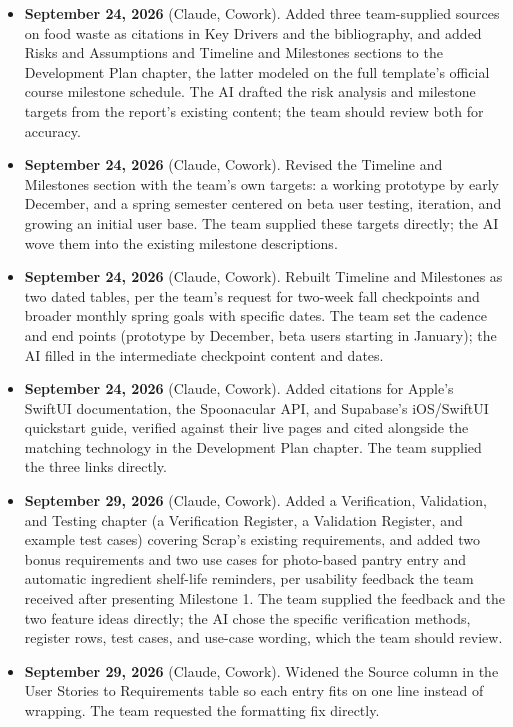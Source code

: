 \begin{itemize}[leftmargin=1.4em]
\item \textbf{September 24, 2026} (Claude, Cowork). Added three team-supplied sources on food waste as citations in Key Drivers and the bibliography, and added Risks and Assumptions and Timeline and Milestones sections to the Development Plan chapter, the latter modeled on the full template's official course milestone schedule. The AI drafted the risk analysis and milestone targets from the report's existing content; the team should review both for accuracy.

\item \textbf{September 24, 2026} (Claude, Cowork). Revised the Timeline and Milestones section with the team's own targets: a working prototype by early December, and a spring semester centered on beta user testing, iteration, and growing an initial user base. The team supplied these targets directly; the AI wove them into the existing milestone descriptions.

\item \textbf{September 24, 2026} (Claude, Cowork). Rebuilt Timeline and Milestones as two dated tables, per the team's request for two-week fall checkpoints and broader monthly spring goals with specific dates. The team set the cadence and end points (prototype by December, beta users starting in January); the AI filled in the intermediate checkpoint content and dates.

\item \textbf{September 24, 2026} (Claude, Cowork). Added citations for Apple's SwiftUI documentation, the Spoonacular API, and Supabase's iOS/SwiftUI quickstart guide, verified against their live pages and cited alongside the matching technology in the Development Plan chapter. The team supplied the three links directly.

\item \textbf{September 29, 2026} (Claude, Cowork). Added a Verification, Validation, and Testing chapter (a Verification Register, a Validation Register, and example test cases) covering Scrap's existing requirements, and added two bonus requirements and two use cases for photo-based pantry entry and automatic ingredient shelf-life reminders, per usability feedback the team received after presenting Milestone 1. The team supplied the feedback and the two feature ideas directly; the AI chose the specific verification methods, register rows, test cases, and use-case wording, which the team should review.

\item \textbf{September 29, 2026} (Claude, Cowork). Widened the Source column in the User Stories to Requirements table so each entry fits on one line instead of wrapping. The team requested the formatting fix directly.


\end{itemize}
